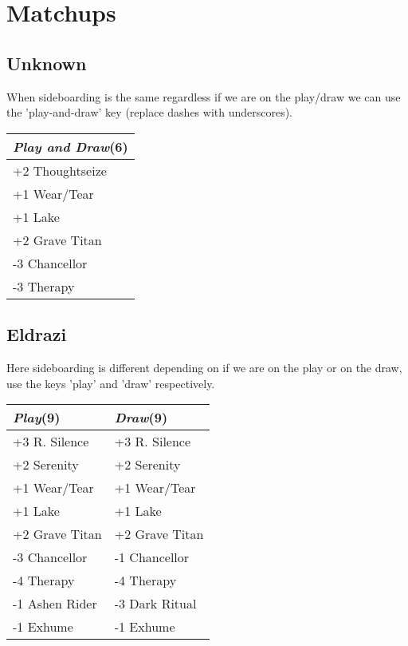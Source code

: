 \documentclass{article}
\renewcommand *\contentsname{Contents}
\begin{document}
\section*{Matchups}
\begin{multicols}{2}
\subsection*{Unknown}
When sideboarding is the same regardless if we are on the play/draw we can use the 'play-and-draw' key (replace dashes with underscores).\begin{center}
\begin{tabular}{| l |}
\hline
\textit{Play and Draw}(6) \\
\hline
\cellcolor[HTML]{BBDDBB}\small{+2 Thoughtseize}\\
\cellcolor[HTML]{BBDDBB}\small{+1 Wear/Tear}\\
\cellcolor[HTML]{BBDDBB}\small{+1 Lake}\\
\cellcolor[HTML]{BBDDBB}\small{+2 Grave Titan}\\
\cellcolor[HTML]{DDBBBB}\small{-3 Chancellor}\\
\cellcolor[HTML]{DDBBBB}\small{-3 Therapy}\\
\hline
\end{tabular}
\end{center}
\subsection*{Eldrazi}
Here sideboarding is different depending on if we are on the play or on the draw, use the keys 'play' and 'draw' respectively.\begin{center}
\begin{tabular}{| l | l |}
\hline
\textit{Play}(9) & \textit{Draw}(9) \\
\hline
\cellcolor[HTML]{BBDDBB}\small{+3 R. Silence} & \cellcolor[HTML]{BBDDBB}\small{+3 R. Silence}\\
\cellcolor[HTML]{BBDDBB}\small{+2 Serenity} & \cellcolor[HTML]{BBDDBB}\small{+2 Serenity}\\
\cellcolor[HTML]{BBDDBB}\small{+1 Wear/Tear} & \cellcolor[HTML]{BBDDBB}\small{+1 Wear/Tear}\\
\cellcolor[HTML]{BBDDBB}\small{+1 Lake} & \cellcolor[HTML]{BBDDBB}\small{+1 Lake}\\
\cellcolor[HTML]{BBDDBB}\small{+2 Grave Titan} & \cellcolor[HTML]{BBDDBB}\small{+2 Grave Titan}\\
\cellcolor[HTML]{DDBBBB}\small{-3 Chancellor} & \cellcolor[HTML]{DDBBBB}\small{-1 Chancellor}\\
\cellcolor[HTML]{DDBBBB}\small{-4 Therapy} & \cellcolor[HTML]{DDBBBB}\small{-4 Therapy}\\
\cellcolor[HTML]{DDBBBB}\small{-1 Ashen Rider} & \cellcolor[HTML]{DDBBBB}\small{-3 Dark Ritual}\\
\cellcolor[HTML]{DDBBBB}\small{-1 Exhume} & \cellcolor[HTML]{DDBBBB}\small{-1 Exhume}\\
\hline
\end{tabular}
\end{center}

\end{multicols}
\end{document}
